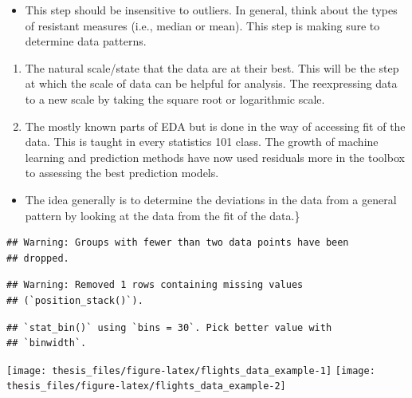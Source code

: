 \documentclass[print]{nuthesis}
\providecommand{\tightlist}{%
  \setlength{\itemsep}{0pt}\setlength{\parskip}{0pt}}
\begin{document}
\begin{itemize}
\tightlist
\item
  This step should be insensitive to outliers. In general, think about the types of resistant measures (i.e., median or mean). This step is making sure to determine data patterns.
\end{itemize}

\begin{enumerate}
\def\labelenumi{\arabic{enumi}.}
\setcounter{enumi}{2}
\item
  The natural scale/state that the data are at their best. This will be the step at which the scale of data can be helpful for analysis. The reexpressing data to a new scale by taking the square root or logarithmic scale.
\item
  The mostly known parts of EDA but is done in the way of accessing fit of the data. This is taught in every statistics 101 class. The growth of machine learning and prediction methods have now used residuals more in the toolbox to assessing the best prediction models.
\end{enumerate}

\begin{itemize}
\tightlist
\item
  The idea generally is to determine the deviations in the data from a general pattern by looking at the data from the fit of the data.\}
\end{itemize}

\begin{verbatim}
## Warning: Groups with fewer than two data points have been
## dropped.
\end{verbatim}

\begin{verbatim}
## Warning: Removed 1 rows containing missing values
## (`position_stack()`).
\end{verbatim}

\begin{verbatim}
## `stat_bin()` using `bins = 30`. Pick better value with
## `binwidth`.
\end{verbatim}

\begin{center}\texttt{[image: thesis\_files/figure-latex/flights\_data\_example-1]} \texttt{[image: thesis\_files/figure-latex/flights\_data\_example-2]} \end{center}

\end{document}
